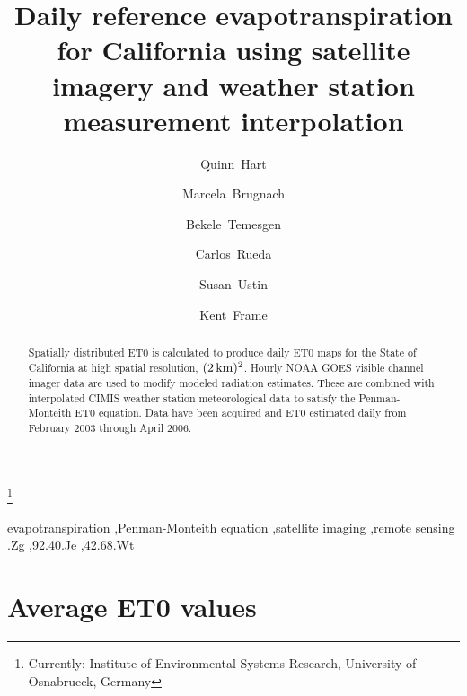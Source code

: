 \documentclass{elsart}
\begin{document}
%
\begin{frontmatter}
  \title{Daily reference evapotranspiration for California using
    satellite imagery and weather station measurement interpolation}
%
\author[calspace]{Quinn~Hart}
\author[calspace]{Marcela~Brugnach}
\author[cimis]{Bekele~Temesgen}
\author[calspace]{Carlos~Rueda}
\author[calspace]{Susan~Ustin}
\author[cimis]{Kent~Frame}

\address[calspace]{CalSpace, University of California, Davis, Davis, CA, USA }

\thanks[marcela]{Currently: Institute of Environmental Systems
  Research, University of Osnabrueck, Germany }

\address[cimis]{California Irrigation Management Information System
  (CIMIS), California Department of Water Resources, Sacramento, CA,
  USA }

\begin{abstract}
  Spatially distributed \ac{ET0} is calculated to produce daily
  \ac{ET0} maps for the State of California at high spatial
  resolution, $(\unit[2]{km})^2$.  Hourly \acs{NOAA} \acs{GOES} visible
  channel imager data are used to modify modeled radiation estimates.
  These are combined with interpolated \acf{CIMIS} weather station
  meteorological data to satisfy the Penman-Monteith \ac{ET0}
  equation.  Data have been acquired and \ac{ET0} estimated daily from
  February 2003 through April 2006.
\end{abstract}

\begin{keyword}
  evapotranspiration \sep Penman-Monteith equation \sep satellite
  imaging \sep remote sensing
.Zg \sep 92.40.Je \sep 42.68.Wt
\end{keyword}
\end{frontmatter}                                



\section{Average \ac{ET0} values}
\end{document}
